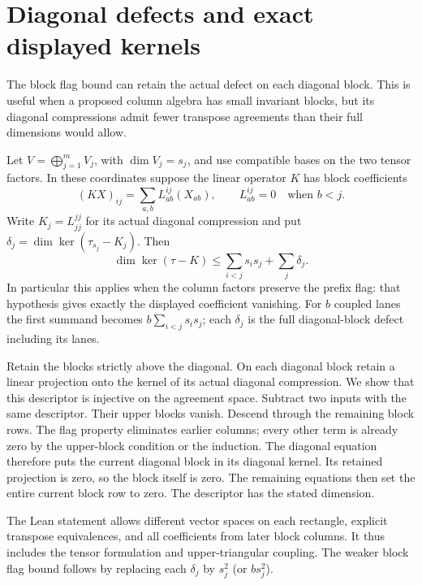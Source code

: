 \section{Diagonal defects and exact displayed kernels}\label{sec:block-defects}

The block flag bound can retain the actual defect on each diagonal block.
This is useful when a proposed column algebra has small invariant blocks,
but its diagonal compressions admit fewer transpose agreements than their
full dimensions would allow.

\begin{theorem}\label{thm:block-defects}
Let $V=\bigoplus_{j=1}^m V_j$, with $\dim V_j=s_j$, and use compatible
bases on the two tensor factors. In these coordinates suppose the linear
operator $K$ has block coefficients
\[
 (KX)_{ij}=\sum_{a,b}L^{ij}_{ab}(X_{ab}),\qquad
 L^{ij}_{ab}=0\quad\text{when }b<j.
\]
Write $K_j=L^{jj}_{jj}$ for its actual diagonal compression and put
$\delta_j=\dim\ker(\tau_{s_j}-K_j)$. Then
\[
 \dim\ker(\tau-K)\le \sum_{i<j}s_i s_j+\sum_j\delta_j.
\]
In particular this applies when the column factors preserve the prefix flag:
that hypothesis gives exactly the displayed coefficient vanishing.
For $b$ coupled lanes the first summand becomes $b\sum_{i<j}s_i s_j$;
each $\delta_j$ is the full diagonal-block defect including its lanes.
\end{theorem}

\begin{outline}
Retain the blocks strictly above the diagonal. On each diagonal block
retain a linear projection onto the kernel of its actual diagonal
compression. We show that this descriptor is injective on the agreement
space. Subtract two inputs with the same descriptor. Their upper blocks
vanish. Descend through the remaining block rows. The flag property
eliminates earlier columns; every other term is already zero by the
upper-block condition or the induction. The diagonal equation therefore
puts the current diagonal block in its diagonal kernel. Its retained
projection is zero, so the block itself is zero. The remaining equations
then set the entire current block row to zero. The descriptor has the
stated dimension.

The Lean statement allows different vector spaces on each rectangle,
explicit transpose equivalences, and all coefficients from later block
columns. It thus includes the tensor formulation and upper-triangular
coupling. The weaker block flag bound follows by replacing each
$\delta_j$ by $s_j^2$ (or $bs_j^2$).
\end{outline}

